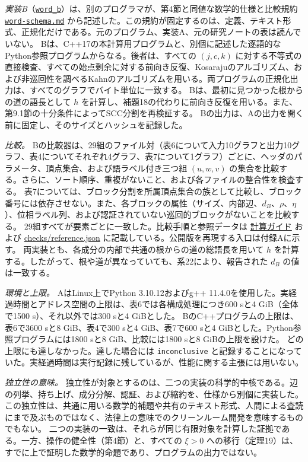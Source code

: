 \documentclass[11pt,reqno]{amsart}
\theoremstyle{definition}
\theoremstyle{definition}
\theoremstyle{remark}
\begin{document}
\emph{実装B}（\href{supplement/COMPUTATION.md}{\nolinkurl{word_b}}）は、別のプログラマが、第4節と同値な数学的仕様と比較規約
\href{supplement/computations/word-schema.md}{\nolinkurl{word-schema.md}}
から記述した。この規約が固定するのは、定義、テキスト形式、正規化だけである。元のプログラム、実装A、元の研究ノートの表は読んでいない。
Bは、C++17の本計算用プログラムと、別個に記述した逐語的なPython参照プログラムからなる。後者は、すべての \((j,c,k)\) に対する不等式の直接検査、すべての始点剰余に対する前向き反復、Kosarajuのアルゴリズム、および非巡回性を調べるKahnのアルゴリズムを用いる。両プログラムの正規化出力は、すべてのグラフでバイト単位に一致する。
Bは、最初に見つかった根からの道の語長として \(h\) を計算し、補題18の代わりに前向き反復を用いる。また、第9.1節の十分条件によってSCC分割を再検証する。
Bの出力は、Aの出力を開く前に固定し、そのサイズとハッシュを記録した。

\emph{比較。} Bの比較器は、29組のファイル対（表6について入力10グラフと出力10グラフ、表4についてそれぞれ4グラフ、表7について1グラフ）ごとに、ヘッダのパラメータ、頂点集合、および語ラベル付き三つ組 \((u,w,v)\) の集合を比較する。さらに、ソート順序、重複がないこと、および各ファイルの整合性を検査する。
表7については、ブロック分割を所属頂点集合の族として比較し、ブロック番号には依存させない。また、各ブロックの属性（サイズ、内部辺、\(d_B\)、\(\rho\)、\(\eta\)）、位相ラベル列、および認証されていない巡回的ブロックがないことを比較する。
29組すべてが要素ごとに一致した。比較手順と参照データは \href{supplement/COMPUTATION.md}{計算ガイド} および \href{checks/reference.json}{checks/reference.json} に記載している。公開版を再現する入口は付録Aに示す。
両実装とも、各成分の内部で共通の根からの道の総語長を用いて \(h\) を計算する。したがって、根や道が異なっていても、系22により、報告された \(d_B\) の値は一致する。

\emph{環境と上限。} AはLinux上でPython 3.10.12およびg++ 11.4.0を使用した。実経過時間とアドレス空間の上限は、表6では各構成処理につき600 sと4 GiB（全体で1500 s）、それ以外では300 sと4 GiBとした。
BのC++プログラムの上限は、表6で3600 sと8 GiB、表4で300 sと4 GiB、表7で600 sと4 GiBとした。Python参照プログラムには1800 sと8 GiB、比較には1800 sと8 GiBの上限を設けた。
どの上限にも達しなかった。達した場合には \texttt{inconclusive} と記録することになっていた。実経過時間は実行記録に残しているが、性能に関する主張には用いない。

\emph{独立性の意味。} 独立性が対象とするのは、二つの実装の科学的中核である。辺の列挙、持ち上げ、成分分解、認証、および縮約を、仕様から別個に実装した。
この独立性は、共通に用いる数学的補題や共有のテキスト形式、人間による査読にまで及ぶものではなく、法律上の意味でのクリーンルーム開発を意味するものでもない。
二つの実装の一致は、それらが同じ有限対象を計算した証拠である。一方、操作の健全性（第4節）と、すべての \(\xi>0\) への移行（定理19）は、すでに上で証明した数学的命題であり、プログラムの出力ではない。
\end{document}

